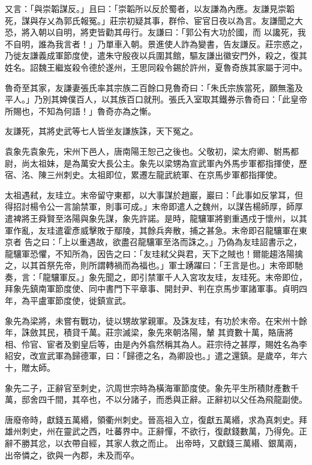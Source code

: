 \begin{pinyinscope}
 又言：「與崇韜謀反。」且曰：「崇韜所以反於蜀者，以友謙為內應。友謙見崇韜死，謀與存乂為郭氏報冤。」莊宗初疑其事，群伶、宦官日夜以為言。友謙聞之大恐，將入朝以自明，將吏皆勸其毋行。友謙曰：「郭公有大功於國，而
 以讒死，我不自明，誰為我言者！」乃單車入朝。景進使人詐為變書，告友謙反。莊宗惑之，乃徙友謙義成軍節度使，遣朱守殷夜以兵圍其館，驅友謙出徽安門外，殺之，復其姓名。詔魏王繼岌殺令德於遂州，王思同殺令錫於許州，夏魯奇族其家屬于河中。



 魯奇至其家，友謙妻張氏率其宗族二百餘口見魯奇曰：「朱氏宗族當死，願無濫及平人。」乃別其婢僕百人，以其族百口就刑。張氏入室取其鐵券示魯奇曰：「此皇帝所賜也，不知為何語！」魯奇亦為之慚。



 友謙死，其將史武等七人皆坐友謙族誅，天下冤之。



 袁象先袁象先，宋州下邑人，唐南陽王恕己之後也。父敬初，梁太府卿、駙馬都尉，尚太祖妹，是為萬安大長公主。象先以梁甥為宣武軍內外馬步軍都指揮使，歷宿、洺、陳三州刺史。太祖即位，累遷左龍武統軍、在京馬步軍都指揮使。



 太祖遇弒，友珪立。末帝留守東都，以大事謀於趙巖，巖曰：「此事如反掌耳，但得招討楊令公一言諭禁軍，則事可成。」末帝即遣人之魏州，以謀告楊師厚，師厚遣裨將王舜賢至洛陽與象先謀，象先許諾。是時，龍驤軍將劉重遇戍于懷州，以其軍作亂，友珪遣霍彥威擊敗于鄢陵，其餘兵奔散，捕之甚急。末帝即召龍驤軍在東京者
 告之曰：「上以重遇故，欲盡召龍驤軍至洛而誅之。」乃偽為友珪詔書示之，龍驤軍恐懼，不知所為，因告之曰：「友珪弒父與君，天下之賊也！爾能趨洛陽擒之，以其首祭先帝，則所謂轉禍而為福也。」軍士踴躍曰：「王言是也。」末帝即馳奏，言：「龍驤軍反。」象先聞之，即引禁軍千人入宮攻友珪，友珪死。末帝即位，拜象先鎮南軍節度使、同中書門下平章事、開封尹、判在京馬步軍諸軍事。貞明四年，為平盧軍節度使，徙鎮宣武。



 象先為梁將，未嘗有戰功，徒以甥故掌親軍。及誅友珪，有功於末帝。在宋州十餘年，誅斂其民，積貸千萬。莊宗滅梁，象先來朝洛陽，輦
 其資數十萬，賂唐將相、伶官、宦者及劉皇后等，由是內外翕然稱其為人。莊宗待之甚厚，賜姓名為李紹安，改宣武軍為歸德軍，曰：「歸德之名，為卿設也。」遣之還鎮。是歲卒，年六十，贈太師。



 象先二子，正辭官至刺史，泬周世宗時為橫海軍節度使。象先平生所積財產數千萬，邸舍四千間，其卒也，不以分諸子，而悉與正辭。正辭初以父任為飛龍副使。



 唐廢帝時，獻錢五萬緡，領衢州刺史。晉高祖入立，復獻五萬緡，求為真刺史。拜雄州刺史，州在靈武之西，吐蕃界中。正辭憚，不欲行，復獻錢數萬，乃得免。正辭不勝其忿，以衣帶自經，其家人救之而止。
 出帝時，又獻錢三萬緡、銀萬兩，出帝憐之，欲與一內郡，未及而卒。




\end{pinyinscope}
